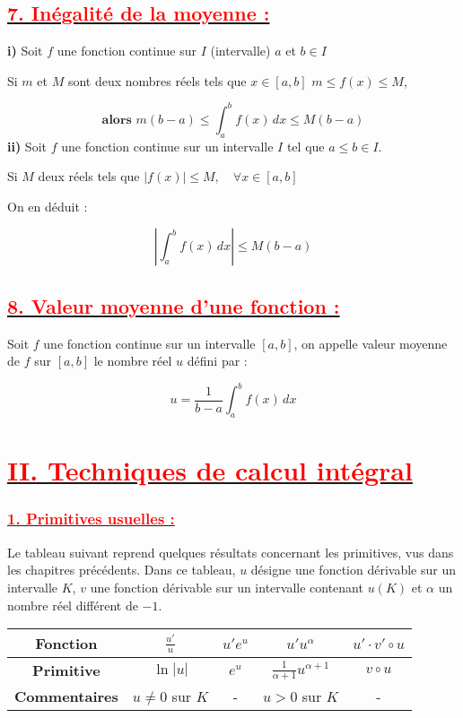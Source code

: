 \documentclass[12pt,a4paper]{article}
\begin{document}
\subsection*{\underline{\textbf{\textcolor{red}{7. Inégalité de la moyenne :}}}}

\textbf{i)} Soit \( f \) une fonction continue sur \( I \) (intervalle) \( a \) et \( b \in I \)

Si \( m \) et \( M \) sont deux nombres réels tels que \( x \in [a, b] \) \( m \leq f(x) \leq M \),  

\[
\textbf{alors }m (b - a) \leq \int_a^b f(x) \, dx \leq M(b - a)
\]  
\textbf{ii)} Soit \( f \) une fonction continue sur un intervalle \( I \) tel que \( a \leq b \in I \).

Si  \( M \) deux réels tels que \(|f(x)| \leq M, \quad \forall x \in [a,b]\)

On en déduit :

\[
\left| \int_a^b f(x) \, dx \right| \leq M (b-a)
\]

\subsection*{\underline{\textbf{\textcolor{red}{8. Valeur moyenne d'une fonction :}}}}

Soit \( f \) une fonction continue sur un intervalle \( [a, b] \), on appelle valeur moyenne de \( f \) sur \( [a, b] \) le nombre réel \( u \) défini par :

\[
u = \frac{1}{b - a} \int_a^b f(x) \, dx
\]
\section*{\underline{\textbf{\textcolor{red}{II. Techniques de calcul intégral}}}}

\subsubsection*{\underline{\textcolor{red}{1. Primitives usuelles :}}}
Le tableau suivant reprend quelques résultats concernant les primitives, vus dans les chapitres précédents. Dans ce tableau, \( u \) désigne une fonction dérivable sur un intervalle \( K \), \( v \) une fonction dérivable sur un intervalle contenant \( u(K) \) et \( \alpha \) un nombre réel différent de \( -1 \).

\begin{tabular}{|c|c|c|c|c|}
\hline
\textbf{Fonction} & \( \frac{u'}{u} \) & \( u' e^u \) & \( u' u^\alpha \) & \( u' \cdot v' \circ u \) \\
\hline
\textbf{Primitive} & \( \ln |u| \) & \( e^u \) & \( \frac{1}{\alpha + 1} u^{\alpha + 1} \) & \( v \circ u \) \\
\hline
\textbf{Commentaires} & \( u \neq 0 \) sur \( K \) & - & \( u > 0 \) sur \( K \) & - \\
\hline
\end{tabular}
\end{document}
